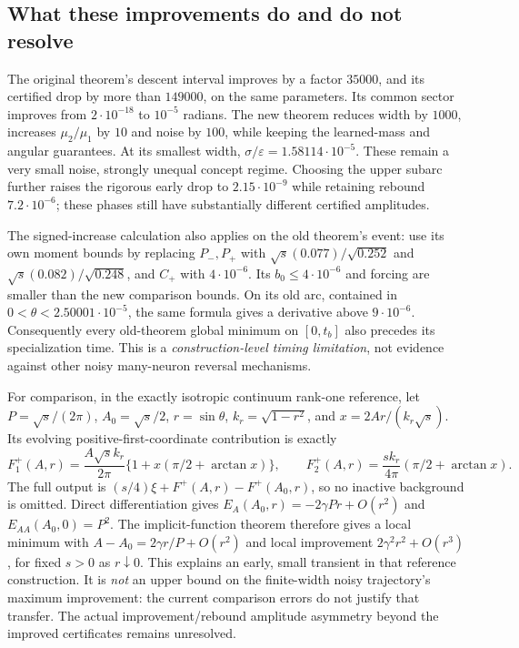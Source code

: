 \documentclass{article} %
\theoremstyle{plain}
\theoremstyle{definition}
\theoremstyle{remark}
\begin{document}
\subsection{What these improvements do and do not resolve}

The original theorem's descent interval improves by a factor $35000$,
and its certified drop by more than $149000$, on the same parameters.
Its common sector improves from $2\cdot10^{-18}$ to $10^{-5}$ radians.
The new theorem reduces width by $1000$, increases $\mu_2/\mu_1$ by $10$
and noise by $100$, while keeping the learned-mass and angular guarantees.
At its smallest width, $\sigma/\varepsilon=1.58114\cdot10^{-5}$.
These remain a very small noise, strongly unequal concept regime.
Choosing the upper subarc further raises the rigorous early drop to
$2.15\cdot10^{-9}$ while retaining rebound $7.2\cdot10^{-6}$;
these phases still have substantially different certified amplitudes.

The signed-increase calculation also applies on the old theorem's event:
use its own moment bounds by replacing $P_-,P_+$ with
$\sqrt{s}(0.077)/\sqrt{0.252}$ and
$\sqrt{s}(0.082)/\sqrt{0.248}$, and $C_+$ with $4\cdot10^{-6}$.
Its $b_0\le4\cdot10^{-6}$ and forcing are smaller than the new
comparison bounds. On its old arc, contained in
$0<\theta<2.50001\cdot10^{-5}$, the same formula gives a derivative
above $9\cdot10^{-6}$. Consequently every old-theorem
global minimum on $[0,t_b]$ also precedes its specialization time.
This is a \emph{construction-level timing limitation}, not evidence
against other noisy many-neuron reversal mechanisms.

For comparison, in the exactly isotropic continuum rank-one reference,
let $P=\sqrt{s}/(2\pi)$, $A_0=\sqrt{s}/2$, $r=\sin\theta$,
$k_r=\sqrt{1-r^2}$, and $x=2Ar/(k_r\sqrt{s})$.
Its evolving positive-first-coordinate contribution is exactly
\[
 F_1^+(A,r)=\frac{A\sqrt{s}k_r}{2\pi}
       \{1+x(\pi/2+\arctan x)\},\qquad
 F_2^+(A,r)=\frac{s k_r}{4\pi}(\pi/2+\arctan x).
\]
The full output is $(s/4)\xi+F^+(A,r)-F^+(A_0,r)$, so no inactive
background is omitted. Direct differentiation gives
$E_A(A_0,r)=-2\gamma Pr+O(r^2)$ and
$E_{AA}(A_0,0)=P^2$. The implicit-function theorem therefore gives a
local minimum with
$A-A_0=2\gamma r/P+O(r^2)$ and local improvement
$2\gamma^2r^2+O(r^3)$, for fixed $s>0$ as $r\downarrow0$.
This explains an early, small transient in that reference construction.
It is \emph{not} an upper bound on the finite-width noisy trajectory's
maximum improvement: the current comparison errors do not justify that
transfer. The actual improvement/rebound amplitude asymmetry beyond the
improved certificates remains unresolved.
\end{document}
